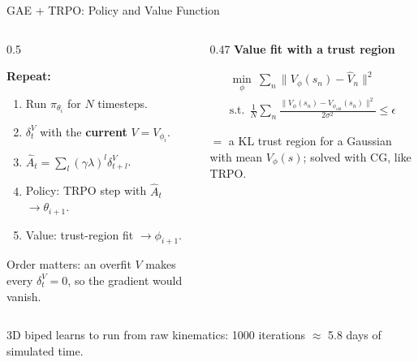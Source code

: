 \documentclass[aspectratio=169]{beamer}
\begin{document}
\begin{frame}{GAE + TRPO: Policy and Value Function}
  \begin{columns}[T]
    \begin{column}{0.5\textwidth}
      \begin{slatebox}
        \small\textbf{Repeat:}
        \begin{enumerate}
          \item Run $\pi_{\theta_i}$ for $N$ timesteps.
          \item $\delta_t^V$ with the \textbf{current} $V=V_{\phi_i}$.
          \item $\hat A_t = \sum_l(\gamma\lambda)^l\delta_{t+l}^V$.
          \item {\color{AtlasCool}Policy}: TRPO step with $\hat A_t$ $\to \theta_{i+1}$.
          \item {\color{AtlasWarm}Value}: trust-region fit $\to \phi_{i+1}$.
        \end{enumerate}
      \end{slatebox}
      \vspace{2pt}
      {\scriptsize\color{NoteGray} Order matters: an overfit $V$ makes every $\delta_t^V=0$, so the gradient would vanish.}
    \end{column}
    \begin{column}{0.47\textwidth}
      \small {\color{AtlasWarm}\textbf{Value fit with a trust region}}
      \begin{warmformulabox}
        \begin{gather*}
          \min_\phi\ \sum_n \big\|V_\phi(s_n) - \hat V_n\big\|^2 \\
          \text{s.t.}\ \ \frac1N\sum_n \frac{\|V_\phi(s_n) - V_{\phi_{\mathrm{old}}}(s_n)\|^2}{2\sigma^2} \le \epsilon
        \end{gather*}
      \end{warmformulabox}
      $=$ a KL trust region for a Gaussian with mean $V_\phi(s)$; solved with CG, like TRPO.
    \end{column}
  \end{columns}

  \vspace{6pt}
  \begin{goodbox}
    \small 3D biped learns to run from raw kinematics: 1000 iterations $\approx$ 5.8 days of simulated time.
  \end{goodbox}
\end{frame}
\end{document}
